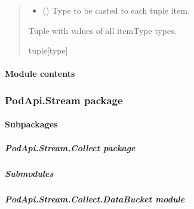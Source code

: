 \documentclass[letterpaper,10pt,english]{sphinxmanual}
\begin{document}
\begin{fulllineitems}
\begin{fulllineitems}
\begin{quote}
\begin{description}
\begin{itemize}
\item {} 
\sphinxAtStartPar
{} () \textendash{} Type to be casted to each tuple item.

\end{itemize}

\sphinxAtStartPar
Tuple with values of all itemType types.

\sphinxAtStartPar
tuple{[}type{]}

\end{description}\end{quote}

\end{fulllineitems}


\end{fulllineitems}



\paragraph{Module contents}
\label{\detokenize{PodApi.Parameters:module-PodApi.Parameters}}\label{\detokenize{PodApi.Parameters:module-contents}}
\sphinxstepscope


\subsubsection{PodApi.Stream package}
\label{\detokenize{PodApi.Stream:podapi-stream-package}}\label{\detokenize{PodApi.Stream::doc}}

\paragraph{Subpackages}
\label{\detokenize{PodApi.Stream:subpackages}}
\sphinxstepscope


\subparagraph{PodApi.Stream.Collect package}
\label{\detokenize{PodApi.Stream.Collect:podapi-stream-collect-package}}\label{\detokenize{PodApi.Stream.Collect::doc}}

\subparagraph{Submodules}
\label{\detokenize{PodApi.Stream.Collect:submodules}}

\subparagraph{PodApi.Stream.Collect.DataBucket module}
\label{\detokenize{PodApi.Stream.Collect:module-PodApi.Stream.Collect.DataBucket}}\label{\detokenize{PodApi.Stream.Collect:podapi-stream-collect-databucket-module}}
\end{document}
